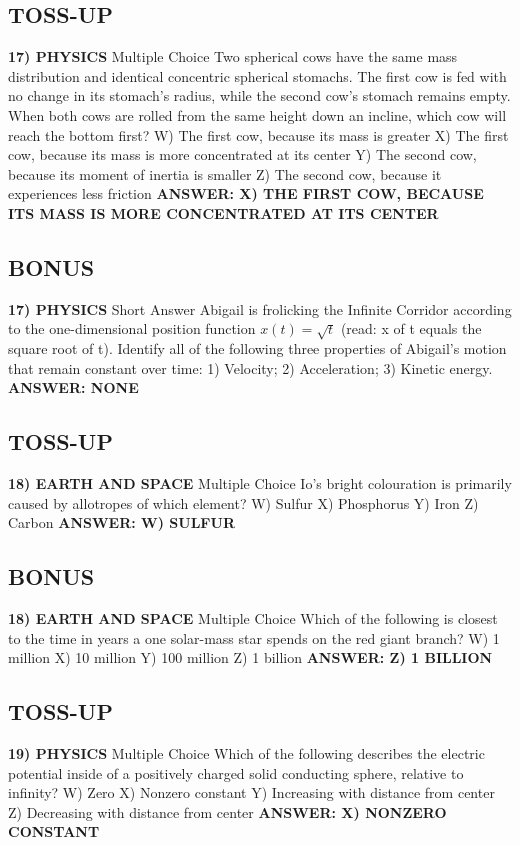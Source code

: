 \documentclass{article}
\begin{document}
\newpage

\subsection*{TOSS-UP}
\textbf{17) PHYSICS}
Multiple Choice Two spherical cows have the same mass distribution and identical concentric spherical stomachs.
The first cow is fed with no change in its stomach's radius, while the second cow's stomach remains empty.
When both cows are rolled from the same height down an incline, which cow will reach the bottom first?
W) The first cow, because its mass is greater
X) The first cow, because its mass is more concentrated at its center
Y) The second cow, because its moment of inertia is smaller
Z) The second cow, because it experiences less friction
\textbf{ANSWER: X) THE FIRST COW, BECAUSE ITS MASS IS MORE CONCENTRATED AT ITS CENTER}

\subsection*{BONUS}
\textbf{17) PHYSICS}
Short Answer Abigail is frolicking the Infinite Corridor according to the one-dimensional position function $x(t)=\sqrt{t}$ (read: x of t equals the square root of t).
Identify all of the following three properties of Abigail's motion that remain constant over time: 1) Velocity; 2) Acceleration; 3) Kinetic energy.
\textbf{ANSWER: NONE}

\newpage

\subsection*{TOSS-UP}
\textbf{18) EARTH AND SPACE}
Multiple Choice Io's bright colouration is primarily caused by allotropes of which element?
W) Sulfur
X) Phosphorus
Y) Iron
Z) Carbon
\textbf{ANSWER: W) SULFUR}

\subsection*{BONUS}
\textbf{18) EARTH AND SPACE}
Multiple Choice Which of the following is closest to the time in years a one solar-mass star spends on the red giant branch?
W) 1 million
X) 10 million
Y) 100 million
Z) 1 billion
\textbf{ANSWER: Z) 1 BILLION}

\subsection*{TOSS-UP}
\textbf{19) PHYSICS}
Multiple Choice Which of the following describes the electric potential inside of a positively charged solid conducting sphere, relative to infinity?
W) Zero
X) Nonzero constant
Y) Increasing with distance from center
Z) Decreasing with distance from center
\textbf{ANSWER: X) NONZERO CONSTANT}
\end{document}
